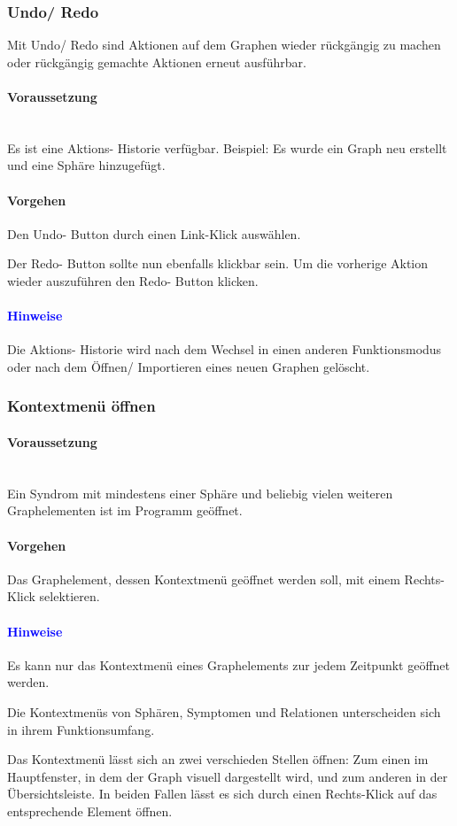 \documentclass[enabledeprecatedfontcommands,fontsize=11pt,paper=a4,twoside]{scrartcl}
\newcommand*{\bbe}{\textcolor{bbe}}
\newcounter{one}
\newcounter{two}[one]
\newcommand*{\hint}{\paragraph{\textcolor{blue}{Hinweise}}}
\newcommand*{\condition}{\paragraph{Voraussetzung}$\;$ \vspace{0.2cm}\\}
\newcommand*{\action}{\paragraph{Vorgehen}}
\let\tempone\itemize
\let\temptwo\enditemize
\renewenvironment{itemize}{\tempone\addtolength{\itemsep}{-10.0pt}}{\temptwo}
\let\origenumerate\enumerate
\let\origendenumerate\endenumerate
\renewenvironment{enumerate}{\origenumerate \addtolength{\itemsep}{-10.0pt}}{\origendenumerate}
\begin{document}
		\subsubsection{Undo/ Redo}
		Mit Undo/ Redo sind Aktionen auf dem Graphen wieder rückgängig zu machen oder rückgängig gemachte Aktionen erneut ausführbar. 
		\condition
		Es ist eine Aktions- Historie verfügbar. Beispiel: Es wurde ein Graph neu erstellt und eine Sphäre hinzugefügt. 	
		\action
		\begin{enumerate}
			\item Den Undo- Button durch einen Link-Klick auswählen. 
			\item Der Redo- Button sollte nun ebenfalls klickbar sein. Um die vorherige Aktion wieder auszuführen den Redo- Button klicken. 
		\end{enumerate}	
		\hint
		\begin{itemize}
			\item Die Aktions- Historie wird nach dem Wechsel in einen anderen Funktionsmodus oder nach dem Öffnen/ Importieren eines neuen Graphen gelöscht. \\ 
		\end{itemize}		
					
				\newpage
\subsubsection{Kontextmenü öffnen}
		\condition 	
		Ein Syndrom mit mindestens einer Sphäre und beliebig vielen weiteren Graphelementen ist im Programm geöffnet.
		\action
		\begin{enumerate}
				\item Das Graphelement, dessen Kontextmenü geöffnet werden soll, mit einem Rechts-Klick selektieren.
		\end{enumerate}
		\hint
		\begin{itemize}
				\item Es kann nur das Kontextmenü eines Graphelements zur jedem Zeitpunkt geöffnet werden.
				\item Die Kontextmenüs von Sphären, Symptomen und Relationen unterscheiden sich in ihrem Funktionsumfang.
				\item \bbe{Das Kontextmenü lässt sich an zwei verschieden Stellen öffnen:} Zum einen im Hauptfenster, in dem der Graph visuell dargestellt wird, und zum anderen in der Übersichtsleiste. In beiden Fallen lässt es sich durch einen Rechts-Klick auf das entsprechende Element öffnen. \\
	 	\end{itemize}	 	
		
\end{document}
